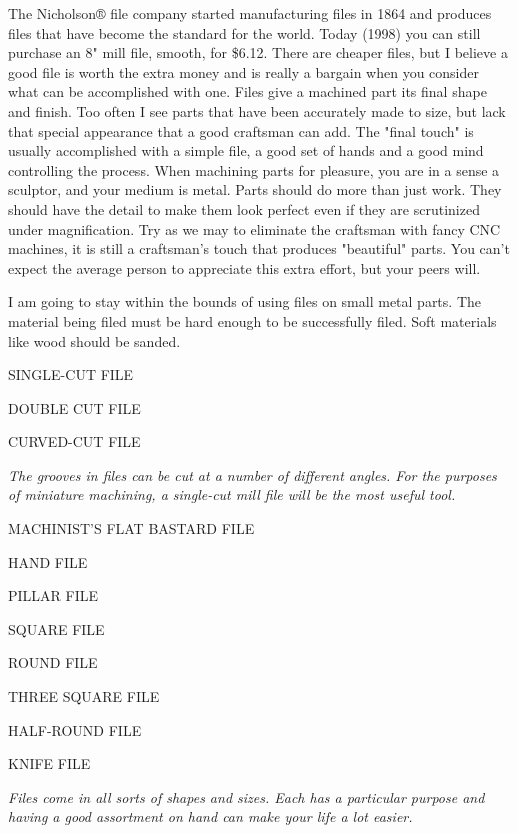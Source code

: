 \secdown

The Nicholson® file company started manufacturing files in 1864 and produces
files that have become the standard for the world. Today (1998) you can still
purchase an 8" mill file, smooth, for \$6.12. There are cheaper files, but I
believe a good file is worth the extra money and is really a bargain when you
consider what can be accomplished with one. Files give a machined part its final
shape and finish. Too often I see parts that have been accurately made to size,
but lack that special appearance that a good craftsman can add. The "final
touch" is usually accomplished with a simple file, a good set of hands and a
good mind controlling the process. When machining parts for pleasure, you are in
a sense a sculptor, and your medium is metal. Parts should do more than just
work. They should have the detail to make them look perfect even if they are
scrutinized under magnification. Try as we may to eliminate the craftsman with
fancy CNC machines, it is still a craftsman's touch that produces "beautiful"
parts. You can't expect the average person to appreciate this extra effort, but
your peers will.

I am going to stay within the bounds of using files on small metal parts. The
material being filed must be hard enough to be successfully filed. Soft
materials like wood should be sanded.

\bigskip

\textsc{SINGLE-CUT FILE}

\textsc{DOUBLE CUT FILE}

\textsc{CURVED-CUT FILE}

\textit{The grooves in files can be cut at a number of different angles. For the
purposes of miniature machining, a single-cut mill file will be the most useful
tool.}
\bigskip

\textsc{MACHINIST'S FLAT BASTARD FILE}

\textsc{HAND FILE}

\textsc{PILLAR FILE}

\textsc{SQUARE FILE}

\textsc{ROUND FILE}

\textsc{THREE SQUARE FILE}

\textsc{HALF-ROUND FILE}

\textsc{KNIFE FILE}

\textit{Files come in all sorts of shapes and sizes. Each has a particular
purpose and having a good assortment on hand can make your life a lot easier.}
\bigskip

